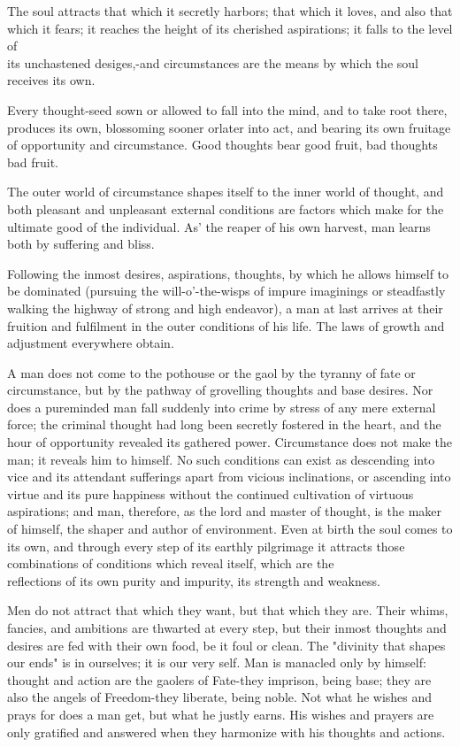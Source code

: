 \documentclass[10pt]{article}
\begin{document}
The soul attracts that which it secretly harbors; that which it loves, and also that which it fears; it reaches the height of its cherished aspirations; it falls to the level of\\
its unchastened desiges,-and circumstances are the means by which the soul receives its own.

Every thought-seed sown or allowed to fall into the mind, and to take root there, produces its own, blossoming sooner orlater into act, and bearing its own fruitage of opportunity and circumstance. Good thoughts bear good fruit, bad thoughts bad fruit.

The outer world of circumstance shapes itself to the inner world of thought, and both pleasant and unpleasant external conditions are factors which make for the ultimate good of the individual. As' the reaper of his own harvest, man learns both by suffering and bliss.

Following the inmost desires, aspirations, thoughts, by which he allows himself to be dominated (pursuing the will-o'-the-wisps of impure imaginings or steadfastly walking the highway of strong and high endeavor), a man at last arrives at their fruition and fulfilment in the outer conditions of his life. The laws of growth and adjustment everywhere obtain.

A man does not come to the pothouse or the gaol by the tyranny of fate or circumstance, but by the pathway of grovelling thoughts and base desires. Nor does a pureminded man fall suddenly into crime by stress of any mere external force; the criminal thought had long been secretly fostered in the heart, and the hour of opportunity revealed its gathered power. Circumstance does not make the man; it reveals him to himself. No such conditions can exist as descending into vice and its attendant sufferings apart from vicious inclinations, or ascending into virtue and its pure happiness without the continued cultivation of virtuous aspirations; and man, therefore, as the lord and master of thought, is the maker of himself, the shaper and author of environment. Even at birth the soul comes to its own, and through every step of its earthly pilgrimage it attracts those combinations of conditions which reveal itself, which are the\\
reflections of its own purity and impurity, its strength and weakness.

Men do not attract that which they want, but that which they are. Their whims, fancies, and ambitions are thwarted at every step, but their inmost thoughts and desires are fed with their own food, be it foul or clean. The "divinity that shapes our ends" is in ourselves; it is our very self. Man is manacled only by himself: thought and action are the gaolers of Fate-they imprison, being base; they are also the angels of Freedom-they liberate, being noble. Not what he wishes and prays for does a man get, but what he justly earns. His wishes and prayers are only gratified and answered when they harmonize with his thoughts and actions.
\end{document}
